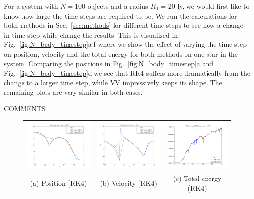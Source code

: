 \documentclass{article}
\begin{document}
\begin{multicols}{2}
For a system with $N = 100$ objects and a radius $R_0$ = 20 ly, we would first like to know how large the time steps are required to be. We run the calculations for both methods in Sec.~\ref{sec:methods} for different time steps to see how a change in time step while change the results. This is visualized in Fig.~\ref{fig:N_body_timestep}a-f where we show the effect of varying the time step on position, velocity and the total energy for both methods on one star in the system. Comparing the positions in Fig.~\ref{fig:N_body_timestep}a and Fig.~\ref{fig:N_body_timestep}d we see that RK4 suffers more dramatically from the change to a larger time step, while VV impressively keeps its shape. The remaining plots are very similar in both cases. 

COMMENTS!

\begin{figure}
\begin{center}
\begin{tabular}{ccc}
  	\includegraphics[width=60mm]{Images/comparison_N_RK4_position.png}
	& \includegraphics[width=60mm]{Images/comparison_N_RK4_velocity.png} 
	& \includegraphics[width=60mm]{Images/comparison_E_RK4_0001.png}\\
	(a) Position (RK4)				& (b) Velocity (RK4)  		& (c) Total energy (RK4) \\[6pt]
	

\end{tabular}
\end{center}
\end{figure}
\end{multicols}
\end{document}
